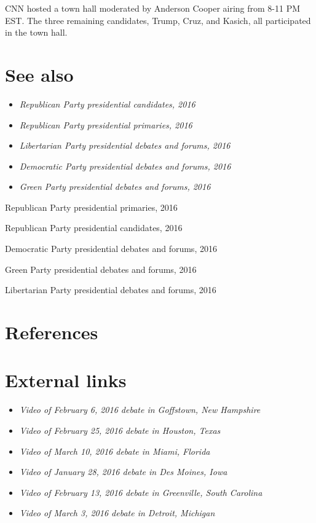CNN hosted a town hall moderated by Anderson Cooper airing from 8-11 PM
EST. The three remaining candidates, Trump, Cruz, and Kasich, all
participated in the town hall.

\section{See also}\label{see-also}

\begin{itemize}
\item
  \emph{Republican Party presidential candidates, 2016}
\item
  \emph{Republican Party presidential primaries, 2016}
\item
  \emph{Libertarian Party presidential debates and forums, 2016}
\item
  \emph{Democratic Party presidential debates and forums, 2016}
\item
  \emph{Green Party presidential debates and forums, 2016}
\end{itemize}

Republican Party presidential primaries, 2016

Republican Party presidential candidates, 2016

Democratic Party presidential debates and forums, 2016

Green Party presidential debates and forums, 2016

Libertarian Party presidential debates and forums, 2016

\section{References}\label{references}

\section{External links}\label{external-links}

\begin{itemize}
\item
  \emph{Video of February 6, 2016 debate in Goffstown, New Hampshire}
\item
  \emph{Video of February 25, 2016 debate in Houston, Texas}
\item
  \emph{Video of March 10, 2016 debate in Miami, Florida}
\item
  \emph{Video of January 28, 2016 debate in Des Moines, Iowa}
\item
  \emph{Video of February 13, 2016 debate in Greenville, South Carolina}
\item
  \emph{Video of March 3, 2016 debate in Detroit, Michigan}
\end{itemize}

